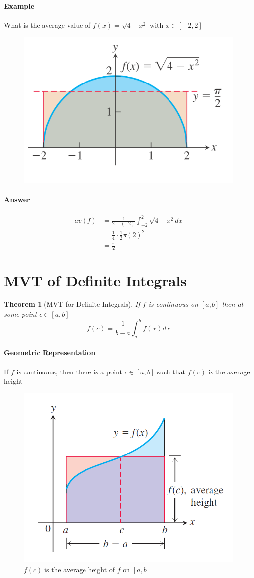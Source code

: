 \documentclass[12pt]{article}
\newtheorem{theorem}{Theorem}
\begin{document}
\paragraph{Example} What is the average value of $f(x) = \sqrt{4 - x^2}$ with $x \in [-2, 2]$
\begin{figure}[H]
    \centering
    \includegraphics[width = 0.5\linewidth]{Images/average example.png}
\end{figure}
\paragraph{Answer}
\begin{align*} 
     av(f) &= \frac{1}{2 - ( - 2)} \int_{ - 2}^2 \sqrt{4 - x^2} dx \\
     &= \frac{1}{4} \cdot \frac{1}{2} \pi (2)^2 \\
     &= \frac{\pi}{2}
\end{align*}

\section{MVT of Definite Integrals}
\begin{theorem}[MVT for Definite Integrals]
     If $f$ is continuous on $[a, b]$ then at some point $c \in [a, b]$
     \[
         f(c) = \frac{1}{b - a} \int_a^b f(x) dx
     \]
\end{theorem}

\paragraph{Geometric Representation}
If $f$ is continuous, then there is a point $c \in [a, b]$ such that $f(c)$ is the average height
\begin{figure}[H]
     \centering
     \includegraphics[width = 0.5\linewidth]{Images/mvt integral.png}
     \caption{$f(c)$ is the average height of $f$ on $[a, b]$}
\end{figure}
\end{document}
